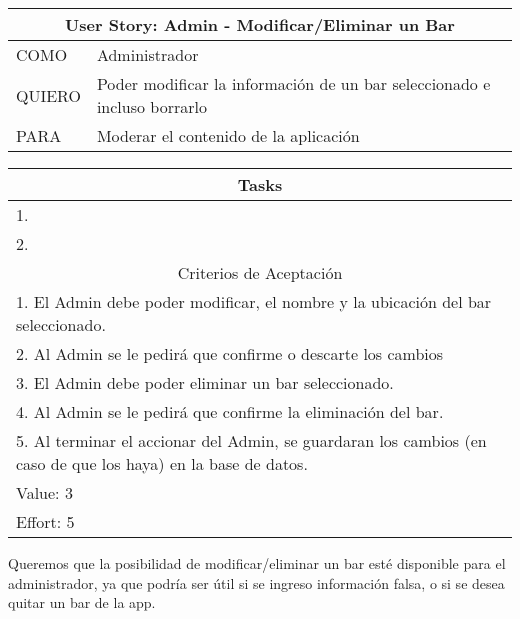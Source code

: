     \begin{table}[H]
        \centering
        \begin{tabular}{| p{1.5cm}| p{10.2cm} |}
            \hline
            \multicolumn{2}{|c|}{User Story: Admin - Modificar/Eliminar un Bar} \\
            \hline
            COMO & Administrador \\ \hline
            QUIERO & Poder modificar la información de un bar seleccionado e incluso borrarlo \\ \hline
            PARA & Moderar el contenido de la aplicación \\ \hline
            \hline
        \end{tabular}
        \begin{tabular}{| p{12.118cm} |}
            \multicolumn{1}{|c|}{Tasks} \\
            \hline
            1. \\ \hline
            2. \\ \hline
            \hline
            \multicolumn{1}{|c|}{Criterios de Aceptación} \\
            \hline
            1. El Admin debe poder modificar, el nombre y la ubicación del bar seleccionado. \\ \hline
            2. Al Admin se le pedirá que confirme o descarte los cambios \\ \hline
            3. El Admin debe poder eliminar un bar seleccionado. \\ \hline
            4. Al Admin se le pedirá que confirme la eliminación del bar. \\ \hline
            5. Al terminar el accionar del Admin, se guardaran los cambios (en caso de que los haya) en la base de datos. \\ \hline
            Value: 3 \\ \hline
            Effort: 5 \\ \hline
        \end{tabular}
    \end{table}
    
     Queremos que la posibilidad de modificar/eliminar un bar esté disponible para el administrador, ya que podría ser útil si se ingreso información falsa, o si se desea quitar un bar de la app. \\
    
